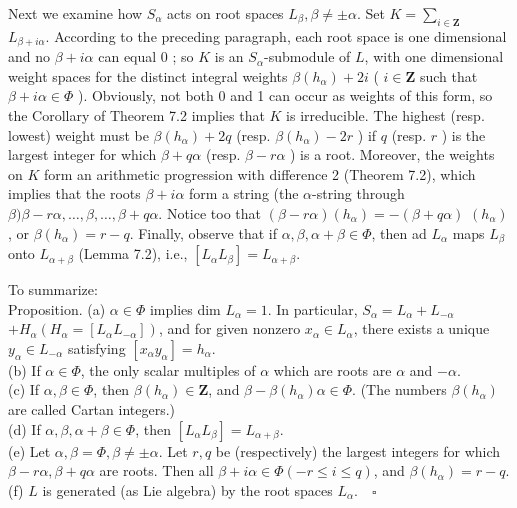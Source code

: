 \documentclass[10pt]{article}
\begin{document}
Next we examine how $S_{\alpha}$ acts on root spaces $L_{\beta}, \beta \neq \pm \alpha$. Set $K=\sum_{i \in \mathbf{Z}}$\\
$L_{\beta+i \alpha}$. According to the preceding paragraph, each root space is one dimensional and no $\beta+i \alpha$ can equal 0 ; so $K$ is an $S_{\alpha}$-submodule of $L$, with one dimensional weight spaces for the distinct integral weights $\beta\left(h_{\alpha}\right)+2 i$ ( $i \in \mathbf{Z}$ such that $\beta+i \alpha \in \Phi$ ). Obviously, not both 0 and 1 can occur as weights of this form, so the Corollary of Theorem 7.2 implies that $K$ is irreducible. The highest (resp. lowest) weight must be $\beta\left(h_{\alpha}\right)+2 q$ (resp. $\beta\left(h_{\alpha}\right)-2 r$ ) if $q$ (resp. $r$ ) is the largest integer for which $\beta+q \alpha$ (resp. $\beta-r \alpha$ ) is a root. Moreover, the weights on $K$ form an arithmetic progression with difference 2 (Theorem 7.2), which implies that the roots $\beta+i \alpha$ form a string (the $\alpha$-string through $\beta) \beta-r \alpha, \ldots, \beta, \ldots, \beta+q \alpha$. Notice too that $(\beta-r \alpha)\left(h_{\alpha}\right)=-(\beta+q \alpha)$ $\left(h_{\alpha}\right)$, or $\beta\left(h_{\alpha}\right)=r-q$. Finally, observe that if $\alpha, \beta, \alpha+\beta \in \Phi$, then ad $L_{\alpha}$ maps $L_{\beta}$ onto $L_{\alpha+\beta}$ (Lemma 7.2), i.e., $\left[L_{\alpha} L_{\beta}\right]=L_{\alpha+\beta}$.

To summarize:\\
Proposition. (a) $\alpha \in \Phi$ implies dim $L_{\alpha}=1$. In particular, $S_{\alpha}=L_{\alpha}+L_{-\alpha}$ $+H_{\alpha}\left(H_{\alpha}=\left[L_{\alpha} L_{-\alpha}\right]\right)$, and for given nonzero $x_{\alpha} \in L_{\alpha}$, there exists a unique $y_{\alpha} \in L_{-\alpha}$ satisfying $\left[x_{\alpha} y_{\alpha}\right]=h_{\alpha}$.\\
(b) If $\alpha \in \Phi$, the only scalar multiples of $\alpha$ which are roots are $\alpha$ and $-\alpha$.\\
(c) If $\alpha, \beta \in \Phi$, then $\beta\left(h_{\alpha}\right) \in \mathbf{Z}$, and $\beta-\beta\left(h_{\alpha}\right) \alpha \in \Phi$. (The numbers $\beta\left(h_{\alpha}\right)$ are called Cartan integers.)\\
(d) If $\alpha, \beta, \alpha+\beta \in \Phi$, then $\left[L_{\alpha} L_{\beta}\right]=L_{\alpha+\beta}$.\\
(e) Let $\alpha, \beta=\Phi, \beta \neq \pm \alpha$. Let $r, q$ be (respectively) the largest integers for which $\beta-r \alpha, \beta+q \alpha$ are roots. Then all $\beta+i \alpha \in \Phi(-r \leq i \leq q)$, and $\beta\left(h_{\alpha}\right)=r-q$.\\
(f) $L$ is generated (as Lie algebra) by the root spaces $L_{\alpha} . \quad \square$
\end{document}
